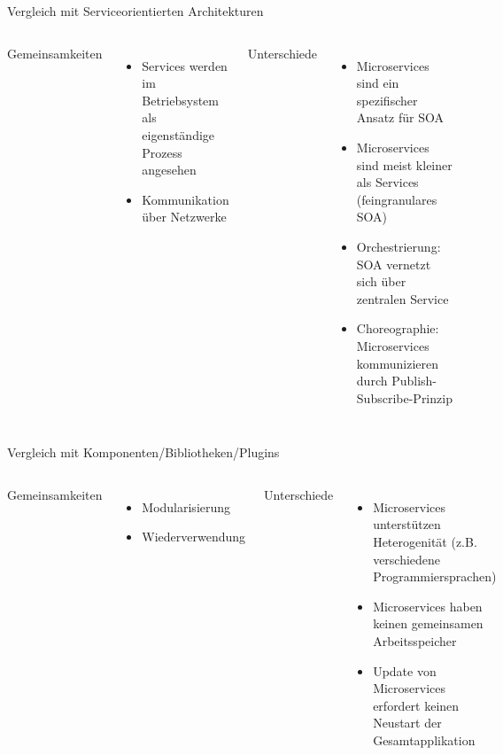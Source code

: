 \begin{frame}{Vergleich mit Serviceorientierten Architekturen}
	\begin{columns}[t]
		Gemeinsamkeiten
		\begin{itemize}
			\item Services werden im Betriebsystem als eigenständige Prozess angesehen
			\item Kommunikation über Netzwerke
		\end{itemize}
		Unterschiede
		\begin{itemize}
			\item Microservices sind ein spezifischer Ansatz für SOA
			\item Microservices sind meist kleiner als Services (feingranulares SOA)
			\item Orchestrierung: SOA vernetzt sich über zentralen Service
			\item Choreographie: Microservices kommunizieren durch Publish-Subscribe-Prinzip
		\end{itemize}
	\end{columns}
\end{frame}

\begin{frame}{Vergleich mit Komponenten/Bibliotheken/Plugins}
	\begin{columns}[t]
		Gemeinsamkeiten
		\begin{itemize}
			\item Modularisierung
			\item Wiederverwendung
		\end{itemize}
		Unterschiede
		\begin{itemize}
			\item Microservices unterstützen Heterogenität (z.B. verschiedene Programmiersprachen)
			\item Microservices haben keinen gemeinsamen Arbeitsspeicher
			\item Update von Microservices erfordert keinen Neustart der Gesamtapplikation
		\end{itemize}
	\end{columns}
\end{frame}

